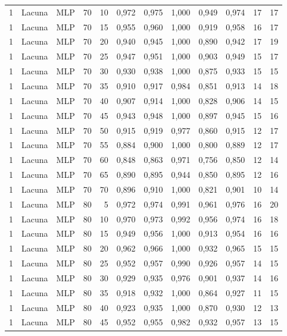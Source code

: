 \begin{longtable}{ccclrrrrrrrr}
1 & Lacuna & MLP & 70 & 10 & 0,972 & 0,975 & 1,000 & 0,949 & 0,974 & 17 & 17 \\
1 & Lacuna & MLP & 70 & 15 & 0,955 & 0,960 & 1,000 & 0,919 & 0,958 & 16 & 17 \\
1 & Lacuna & MLP & 70 & 20 & 0,940 & 0,945 & 1,000 & 0,890 & 0,942 & 17 & 19 \\
1 & Lacuna & MLP & 70 & 25 & 0,947 & 0,951 & 1,000 & 0,903 & 0,949 & 15 & 17 \\
1 & Lacuna & MLP & 70 & 30 & 0,930 & 0,938 & 1,000 & 0,875 & 0,933 & 15 & 15 \\
1 & Lacuna & MLP & 70 & 35 & 0,910 & 0,917 & 0,984 & 0,851 & 0,913 & 14 & 18 \\
1 & Lacuna & MLP & 70 & 40 & 0,907 & 0,914 & 1,000 & 0,828 & 0,906 & 14 & 15 \\
1 & Lacuna & MLP & 70 & 45 & 0,943 & 0,948 & 1,000 & 0,897 & 0,945 & 15 & 16 \\
1 & Lacuna & MLP & 70 & 50 & 0,915 & 0,919 & 0,977 & 0,860 & 0,915 & 12 & 17 \\
1 & Lacuna & MLP & 70 & 55 & 0,884 & 0,900 & 1,000 & 0,800 & 0,889 & 12 & 17 \\
1 & Lacuna & MLP & 70 & 60 & 0,848 & 0,863 & 0,971 & 0,756 & 0,850 & 12 & 14 \\
1 & Lacuna & MLP & 70 & 65 & 0,890 & 0,895 & 0,944 & 0,850 & 0,895 & 12 & 16 \\
1 & Lacuna & MLP & 70 & 70 & 0,896 & 0,910 & 1,000 & 0,821 & 0,901 & 10 & 14 \\
1 & Lacuna & MLP & 80 & 5 & 0,972 & 0,974 & 0,991 & 0,961 & 0,976 & 16 & 20 \\
1 & Lacuna & MLP & 80 & 10 & 0,970 & 0,973 & 0,992 & 0,956 & 0,974 & 16 & 18 \\
1 & Lacuna & MLP & 80 & 15 & 0,949 & 0,956 & 1,000 & 0,913 & 0,954 & 16 & 16 \\
1 & Lacuna & MLP & 80 & 20 & 0,962 & 0,966 & 1,000 & 0,932 & 0,965 & 15 & 15 \\
1 & Lacuna & MLP & 80 & 25 & 0,952 & 0,957 & 0,990 & 0,926 & 0,957 & 14 & 15 \\
1 & Lacuna & MLP & 80 & 30 & 0,929 & 0,935 & 0,976 & 0,901 & 0,937 & 14 & 16 \\
1 & Lacuna & MLP & 80 & 35 & 0,918 & 0,932 & 1,000 & 0,864 & 0,927 & 11 & 15 \\
1 & Lacuna & MLP & 80 & 40 & 0,923 & 0,935 & 1,000 & 0,870 & 0,930 & 12 & 13 \\
1 & Lacuna & MLP & 80 & 45 & 0,952 & 0,955 & 0,982 & 0,932 & 0,957 & 13 & 15 \\

\end{longtable}
